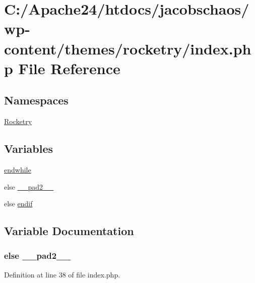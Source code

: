 \hypertarget{index_8php}{}\section{C\+:/\+Apache24/htdocs/jacobschaos/wp-\/content/themes/rocketry/index.php File Reference}
\label{index_8php}
\subsection*{Namespaces}
\begin{DoxyCompactItemize}
\item 
 \hyperlink{namespace_rocketry}{Rocketry}
\end{DoxyCompactItemize}
\subsection*{Variables}
\begin{DoxyCompactItemize}
\item 
\hyperlink{index_8php_a1b05dae45f9e3f4c1fe86048550d2c5b}{endwhile}
\item 
else \hyperlink{index_8php_aed2d37b4e8da3f52103ae96ce9d26d82}{\+\_\+\+\_\+pad2\+\_\+\+\_\+}
\item 
else \hyperlink{index_8php_ab4d017bcc79cd2827c3dce8af2570e91}{endif}
\end{DoxyCompactItemize}


\subsection{Variable Documentation}
\hypertarget{index_8php_aed2d37b4e8da3f52103ae96ce9d26d82}{}
\subsubsection[{\+\_\+\+\_\+pad2\+\_\+\+\_\+}]{\setlength{\rightskip}{0pt plus 5cm}else \+\_\+\+\_\+pad2\+\_\+\+\_\+}\label{index_8php_aed2d37b4e8da3f52103ae96ce9d26d82}


Definition at line 38 of file index.\+php.

\hypertarget{index_8php_ab4d017bcc79cd2827c3dce8af2570e91}{}
